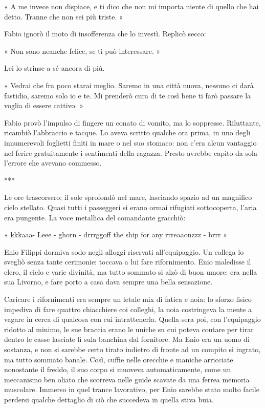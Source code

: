 « A me invece non dispiace, e ti dico che non mi importa niente di quello che hai detto. Tranne che non sei più triste. »

Fabio ignorò il moto di insofferenza che lo investì. Replicò secco:

« Non sono neanche felice, se ti può interessare. »

Lei lo strinse a sé ancora di più.

« Vedrai che fra poco starai meglio. Saremo in una città nuova, nessuno ci darà fastidio, saremo solo io e te. Mi prenderò cura di te così bene ti farò passare la voglia di essere cattivo. »

Fabio provò l'impulso di fingere un conato di vomito, ma lo soppresse. Riluttante, ricambiò l'abbraccio e tacque. Lo aveva scritto qualche ora prima, in uno degli innumerevoli foglietti finiti in mare o nel suo stomaco: non c'era alcun vantaggio nel ferire gratuitamente i sentimenti della ragazza. Presto avrebbe capito da sola l'errore che avevano commesso.

***

Le ore trascorsero; il sole sprofondò nel mare, lasciando spazio ad un magnifico cielo stellato. Quasi tutti i passeggeri si erano ormai rifugiati sottocoperta, l'aria era pungente. La voce metallica del comandante gracchiò:

« kkkaaa- Leee - ghorn - drrrggoff the ship for any rrreaaonzzz - brrr »

Enio Filippi dormiva sodo negli alloggi riservati all'equipaggio. Un collega lo svegliò senza tante cerimonie: toccava a lui fare rifornimento. Enio maledisse il clero, il cielo e varie divinità, ma tutto sommato si alzò di buon umore: era nella sua Livorno, e fare porto a casa dava sempre una bella sensazione.

Caricare i rifornimenti era sempre un letale mix di fatica e noia: lo sforzo fisico impediva di fare quattro chiacchiere coi colleghi, la noia costringeva la mente a vagare in cerca di qualcosa con cui intrattenerla. Quella sera poi, con l'equipaggio ridotto al minimo, le sue braccia erano le uniche su cui poteva contare per tirar dentro le casse lasciate lì sula banchina dal fornitore. Ma Enio era un uomo di sostanza, e non si sarebbe certo tirato indietro di fronte ad un compito sì ingrato, ma tutto sommato banale. Così, cuffie nelle orecchie e maniche arricciate nonostante il freddo, il suo corpo si muoveva automaticamente, come un meccanismo ben oliato che scorreva nelle guide scavate da una ferrea memoria muscolare. Immerso in quel trance lavorativo, per Enio sarebbe stato molto facile perdersi qualche dettaglio di ciò che succedeva in quella stiva buia. 

